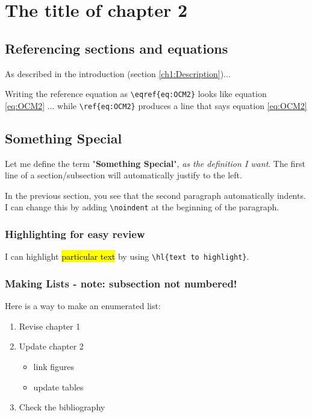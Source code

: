\chapter{The title of chapter 2}
\label{chapter2}

\section{Referencing sections and equations}
As described in the introduction (section \ref{ch1:Description})...

Writing the reference equation as \verb+\eqref{eq:OCM2}+ looks like equation \eqref{eq:OCM2} ... while \verb+\ref{eq:OCM2}+ produces a line that says equation \ref{eq:OCM2}
  
\section{Something Special}

Let me define the term "\textbf{Something Special}", \emph{as the definition I want}. The first line of a section/subsection will automatically justify to the left.

\noindent In the previous section, you see that the second paragraph automatically indents. I can change this by adding \verb+\noindent+ at the beginning of the paragraph.

\subsection{Highlighting for easy review}
I can highlight \hl{particular text} by using \verb+\hl{text to highlight}+. 

\subsection*{Making Lists - note: subsection not numbered!}
Here is a way to make an enumerated list:
\begin{enumerate}
\item Revise chapter 1
\item Update chapter 2
\begin{itemize}
\item link figures
\item update tables
\end{itemize}
\item Check the bibliography
\end{enumerate}